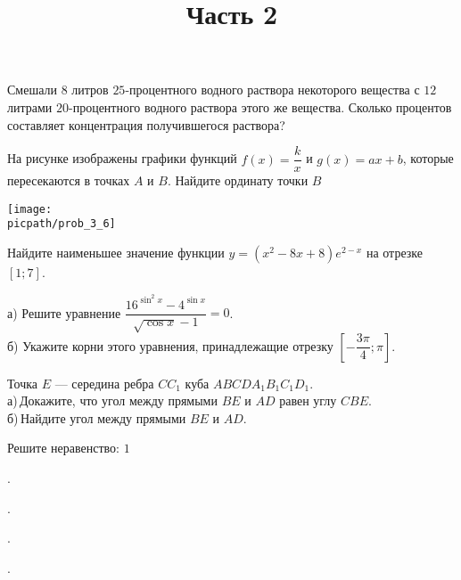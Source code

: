 \begin{training}[2]
\begin{listofex}
		\foranswer
		\item Смешали \( 8 \) литров \( 25 \)-процентного водного раствора некоторого вещества с \( 12 \) литрами \( 20 \)-процентного водного раствора этого же вещества. Сколько процентов составляет концентрация получившегося раствора?
		\foranswer
		\newpage
		\hphantom{Часть 1}
		\item 
		На рисунке изображены графики функций \( f(x)=\dfrac{k}{x} \) и \( g(x)=ax+b \), которые пересекаются в точках \( A \) и \( B \). Найдите ординату точки \( B \)
		\begin{center}
			\texttt{[image: \\picpath/prob\_3\_6]}
		\end{center}
		\foranswer
		\item Найдите наименьшее значение функции \( y=(x^2-8x+8)e^{2-x} \) на отрезке \( \left[ 1; 7\right]  \).
		\foranswer
		\egepreambtwo
		\title{Часть 2}
		\item а) Решите уравнение \( \dfrac{16^{\sin^2x}-4^{\sin x}}{\sqrt{\cos x}-1}=0\). \\
		б) Укажите корни этого уравнения, принадлежащие отрезку \( \left[ -\dfrac{3\pi}{4};\pi \right]  \).
		\newpage
		\hphantom{Часть 1}
		\item Точка \( E \) --- середина ребра \( CC_1 \) куба \( ABCDA_1B_1C_1D_1 \). \\
		а) Докажите, что угол между прямыми \( BE \) и \( AD \) равен углу \( CBE \).\\		
		б) Найдите угол между прямыми \( BE \) и \( AD \).
		\item Решите неравенство: \( 1 \)
		\item .
		\item .
		\item .
		\item .
	\end{listofex}
\end{training}
